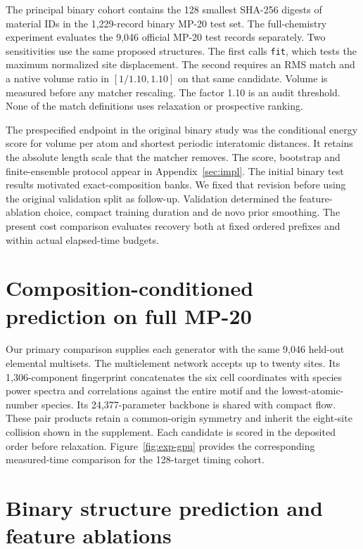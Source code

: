 \documentclass[10pt]{article}
\begin{document}
The principal binary cohort contains the 128 smallest SHA-256 digests of material IDs in the 1,229-record binary MP-20 test set. The full-chemistry experiment evaluates the 9,046 official MP-20 test records separately. Two sensitivities use the same proposed structures. The first calls \texttt{fit}, which tests the maximum normalized site displacement. The second requires an RMS match and a native volume ratio in $[1/1.10,1.10]$ on that same candidate. Volume is measured before any matcher rescaling. The factor 1.10 is an audit threshold. None of the match definitions uses relaxation or prospective ranking.

The prespecified endpoint in the original binary study was the conditional energy score for volume per atom and shortest periodic interatomic distances. It retains the absolute length scale that the matcher removes. The score, bootstrap and finite-ensemble protocol appear in Appendix~\ref{sec:impl}. The initial binary test results motivated exact-composition banks. We fixed that revision before using the original validation split as follow-up. Validation determined the feature-ablation choice, compact training duration and de novo prior smoothing. The present cost comparison evaluates recovery both at fixed ordered prefixes and within actual elapsed-time budgets.

\section{Composition-conditioned prediction on full MP-20}
Our primary comparison supplies each generator with the same 9,046 held-out elemental multisets. The multielement network accepts up to twenty sites. Its 1,306-component fingerprint concatenates the six cell coordinates with species power spectra and correlations against the entire motif and the lowest-atomic-number species. Its 24,377-parameter backbone is shared with compact flow. These pair products retain a common-origin symmetry and inherit the eight-site collision shown in the supplement. Each candidate is scored in the deposited order before relaxation. Figure~\ref{fig:exp-gpu} provides the corresponding measured-time comparison for the 128-target timing cohort.





\section{Binary structure prediction and feature ablations}



\end{document}
